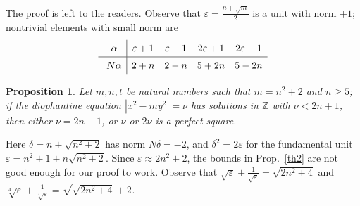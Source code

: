 \documentclass{amsart}
\newtheorem{prop}[lemma]{Proposition}
\newcommand{\rsp}{\raisebox{0em}[2.7ex][1.3ex]{\rule{0em}{2ex} }}
\newcommand{\Z}{{\mathbb Z}}
\newcommand{\eps}{\varepsilon}
\begin{document}
The proof is left to the readers.
Observe that $\eps = \frac{n + \sqrt{m}}{2}$ is a unit with norm $+1$;
nontrivial elements with small norm are
$$ \begin{array}{c|cccc}
  \rsp \alpha  & \eps+1 & \eps-1 & 2\eps+1 & 2\eps-1 \\ \hline 
  \rsp N\alpha & 2 + n  &  2 - n & 5 + 2n & 5 - 2n 
  \end{array} $$

\begin{prop}\label{th5}
  Let $m, n, t$ be natural numbers such that $m=n^2+2$ and $n \ge 5$;
  if the diophantine equation $|x^2 - my^2| = \nu$ has solutions in $\Z$
  with $\nu < 2n+1$, then either $\nu = 2n-1$, or $\nu$ or $2 \nu$ is a
  perfect square.
\end{prop}

Here $\delta = n + \sqrt{n^2+2}$ has norm $N\delta  = -2$, and
$\delta^2 = 2\eps$ for the fundamental unit $\eps = n^2+1 + n\sqrt{n^2+2}$.
Since $\eps \approx 2n^2+2$, the bounds in Prop.~\ref{th2}   are not good enough 
for our proof to work. Observe that $\sqrt{\eps} + \frac1{\sqrt{\eps}} = \sqrt{2n^2 +4}$ 
and $\sqrt[4]{\eps} + \frac1{\sqrt[4]{\eps}} = \sqrt{\sqrt{2n^2 + 4} + 2}$.
\end{document}

